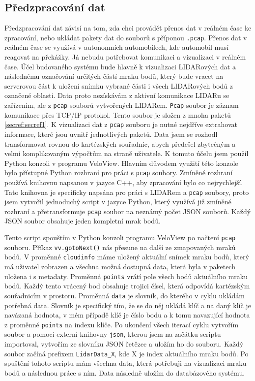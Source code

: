 \documentclass[czech,bachelor,dept420,male,cpdeclaration]{diploma}
\begin{document}
\subsection{Předzpracování dat}\label{secref:predzpracref1}
Předzpracování dat závisí na tom, zda chci provádět přenos dat v reálném čase ke zpracování, nebo ukládat pakety dat do souborů s příponou \texttt{.pcap}. Přenos dat v reálném čase se využívá v autonomních automobilech, kde automobil musí reagovat na překážky. Já nebudu potřebovat komunikaci a vizualizaci v reálném čase. Účel budovaného systému bude hlavně k vizualizaci LIDARových dat a následnému označování určitých částí mraku bodů, který bude vracet na serverovou část k uložení snímku vybrané části i všech LIDARových bodů z označené oblasti. 
Data proto nezískávám z aktivní komunikace LIDARu se zařízením, ale z \texttt{pcap} souborů vytvořených LIDARem. \texttt{Pcap} soubor je záznam komunikace přes TCP/IP protokol. Tento soubor je složen z mnoha paketů \ref{secref:secref1}. K vizualizaci dat z \texttt{pcap} souboru je nutné nejdříve extrahovat informace, které jsou uvnitř jednotlivých paketů. Data jsem se rozhodl transformovat rovnou do kartézských souřadnic, abych předešel zbytečným a velmi komplikovaným výpočtům na straně uživatele. K tomuto účelu jsem použil Python konzoli v programu VeloView. Hlavním důvodem využití této konzole bylo přístupné Python rozhraní pro práci s \texttt{pcap} soubory. Zmíněné rozhraní používá knihovnu napsanou v jazyce C++, aby zpracování bylo co nejrychlejší. Tato knihovna je specificky napsána pro práci s LIDARem a \texttt{pcap} soubory, proto jsem vytvořil jednoduchý script v jazyce Python, který využívá již zmíněné rozhraní a přetransformuje \texttt{pcap} soubor na neznámý počet JSON souborů. Každý JSON soubor obsahuje jeden kompletní mrak bodů.



Tento script spouštím v Python konzoli programu VeloView po načtení \texttt{pcap} souboru. Příkaz \texttt{vv.gotoNext()} nás přesune na další ze zmapovaných mraků bodů. V proměnné \texttt{cloudinfo} máme uložený aktuální snímek mraku bodů, který má uživatel zobrazen a všechna možná dostupná data, která byla v paketech uložena i s metadaty. Proměnná \texttt{points} vrátí pole všech bodů aktuálního mraku bodů. Každý tento vrácený bod obsahuje trojici čísel, která odpovídá kartézským souřadnicím v prostoru. Proměnná \texttt{data} je slovník, do kterého v cyklu ukládám potřebná data. Slovník je specifický tím, že se do něj ukládá klíč a na daný klíč je navázaná hodnota, v mém případě klíč je číslo bodu a k tomu navazující hodnota z proměnné \texttt{points} na indexu klíče. Po ukončení všech iterací cyklu vytvořím soubor a pomocí externí knihovny \texttt{json}, kterou jsem na začátku scriptu importoval, vytvořím ze slovníku JSON řetězec a uložím ho do souboru. Každý soubor začíná prefixem \texttt{LidarData\_X}, kde X je index aktuálního mraku bodů. Po spuštění tohoto scriptu mám všechna data, která potřebuji na vizualizaci mraku bodů a následnou práce s ním. Data následně uložím do databázového systému. 
\end{document}

